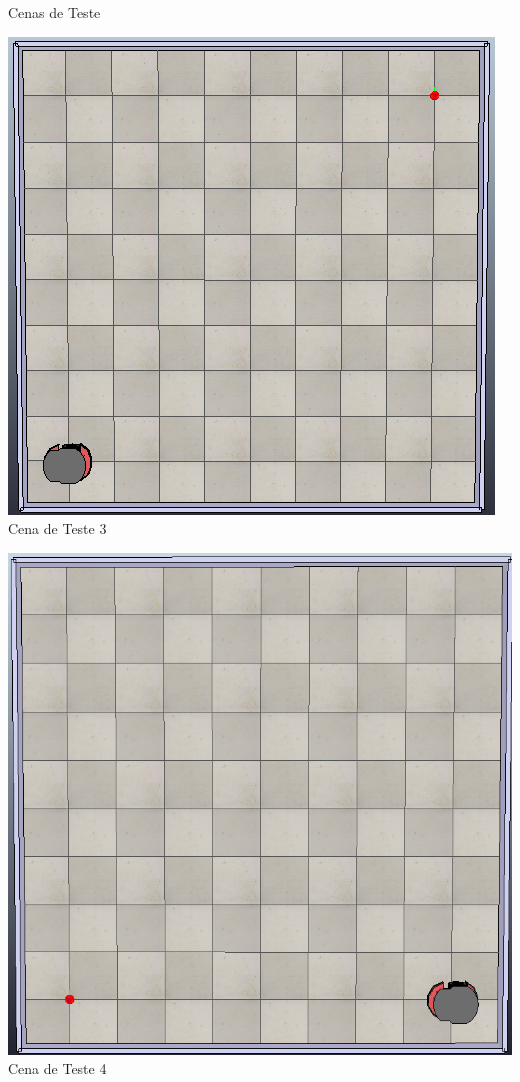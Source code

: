 \documentclass{beamer}
\begin{document}
\begin{frame}{Cenas de Teste}
\begin{minipage}{0.48\linewidth}
    \centering
    \includegraphics[width=\linewidth]{Figuras/Cena_teste_3.png}
   Cena de Teste 3
  \end{minipage}
  \hfill
  \begin{minipage}{0.48\linewidth}
    \centering
    \includegraphics[width=\linewidth]{Figuras/Cena_teste_4.png}
    Cena de Teste 4
  \end{minipage}
\end{frame}
\end{document}
